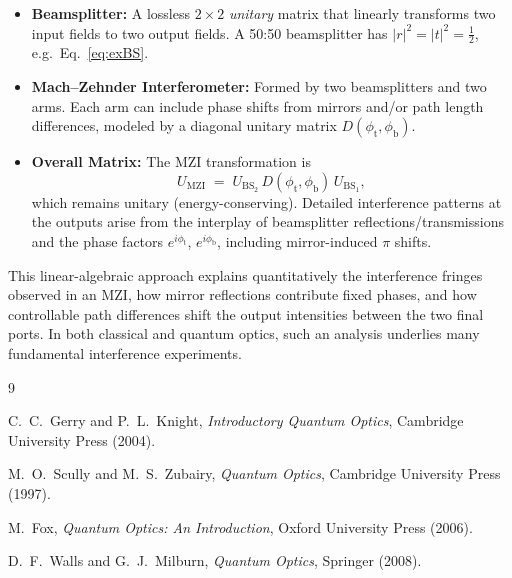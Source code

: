\documentclass[12pt]{article}
\begin{document}
\begin{itemize}
    \item \textbf{Beamsplitter:} A lossless $2\times 2$ \emph{unitary} matrix that linearly transforms two input fields to two output fields.  A 50:50 beamsplitter has $|r|^2=|t|^2=\tfrac12$, e.g.\ Eq.~\eqref{eq:exBS}.
    \item \textbf{Mach--Zehnder Interferometer:} Formed by two beamsplitters and two arms.  Each arm can include phase shifts from mirrors and/or path length differences, modeled by a diagonal unitary matrix $D(\phi_{\mathrm{t}},\phi_{\mathrm{b}})$.  
    \item \textbf{Overall Matrix:} The MZI transformation is
    \[
      U_{\text{MZI}}
      \;=\;
      U_{\text{BS}_2}\,
      D(\phi_{\mathrm{t}}, \phi_{\mathrm{b}})\,
      U_{\text{BS}_1},
    \]
    which remains unitary (energy-conserving).  Detailed interference patterns at the outputs arise from the interplay of beamsplitter reflections/transmissions and the phase factors $e^{i\phi_{\mathrm{t}}}$, $e^{i\phi_{\mathrm{b}}}$, including mirror-induced $\pi$ shifts.
\end{itemize}

This linear-algebraic approach explains quantitatively the interference fringes observed in an MZI, how mirror reflections contribute fixed phases, and how controllable path differences shift the output intensities between the two final ports.  In both classical and quantum optics, such an analysis underlies many fundamental interference experiments.

\vspace{5mm}

\begin{thebibliography}{9}

C.~C.~Gerry and P.~L.~Knight,
\emph{Introductory Quantum Optics},
Cambridge University Press (2004).

M.~O.~Scully and M.~S.~Zubairy,
\emph{Quantum Optics},
Cambridge University Press (1997).

M.~Fox,
\emph{Quantum Optics: An Introduction},
Oxford University Press (2006).

D.~F.~Walls and G.~J.~Milburn,
\emph{Quantum Optics},
Springer (2008).

\end{thebibliography}
\end{document}
